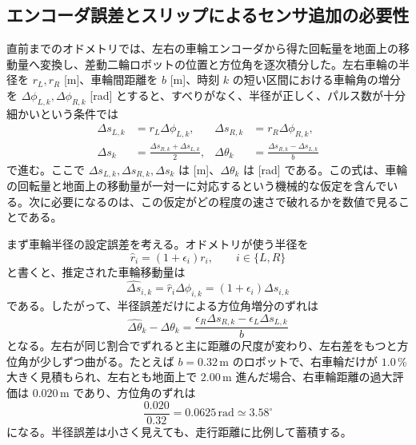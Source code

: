 \subsection{エンコーダ誤差とスリップによるセンサ追加の必要性}

直前までのオドメトリでは、左右の車輪エンコーダから得た回転量を地面上の移動量へ変換し、差動二輪ロボットの位置と方位角を逐次積分した。左右車輪の半径を $r_L,r_R$ [m]、車輪間距離を $b$ [m]、時刻 $k$ の短い区間における車輪角の増分を $\Delta\phi_{L,k},\Delta\phi_{R,k}$ [rad] とすると、すべりがなく、半径が正しく、パルス数が十分細かいという条件では
\begin{align}
  \Delta s_{L,k}&=r_L\Delta\phi_{L,k},&
  \Delta s_{R,k}&=r_R\Delta\phi_{R,k},\\
  \Delta s_k&=\frac{\Delta s_{R,k}+\Delta s_{L,k}}{2},&
  \Delta\theta_k&=\frac{\Delta s_{R,k}-\Delta s_{L,k}}{b}
\end{align}
で進む。ここで $\Delta s_{L,k},\Delta s_{R,k},\Delta s_k$ は [m]、$\Delta\theta_k$ は [rad] である。この式は、車輪の回転量と地面上の移動量が一対一に対応するという機械的な仮定を含んでいる。次に必要になるのは、この仮定がどの程度の速さで破れるかを数値で見ることである。

まず車輪半径の設定誤差を考える。オドメトリが使う半径を
\begin{equation}
  \hat{r}_i=(1+\epsilon_i)r_i,\qquad i\in\{L,R\}
\end{equation}
と書くと、推定された車輪移動量は
\begin{equation}
  \hat{\Delta s}_{i,k}
  =
  \hat{r}_i\Delta\phi_{i,k}
  =
  (1+\epsilon_i)\Delta s_{i,k}
\end{equation}
である。したがって、半径誤差だけによる方位角増分のずれは
\begin{equation}
  \hat{\Delta\theta}_k-\Delta\theta_k
  =
  \frac{\epsilon_R\Delta s_{R,k}-\epsilon_L\Delta s_{L,k}}{b}
\end{equation}
となる。左右が同じ割合でずれると主に距離の尺度が変わり、左右差をもつと方位角が少しずつ曲がる。たとえば $b=0.32\,\mathrm{m}$ のロボットで、右車輪だけが $1.0\,\%$ 大きく見積もられ、左右とも地面上で $2.00\,\mathrm{m}$ 進んだ場合、右車輪距離の過大評価は $0.020\,\mathrm{m}$ であり、方位角のずれは
\begin{equation}
  \frac{0.020}{0.32}=0.0625\,\mathrm{rad}
  \simeq 3.58^\circ
\end{equation}
になる。半径誤差は小さく見えても、走行距離に比例して蓄積する。

